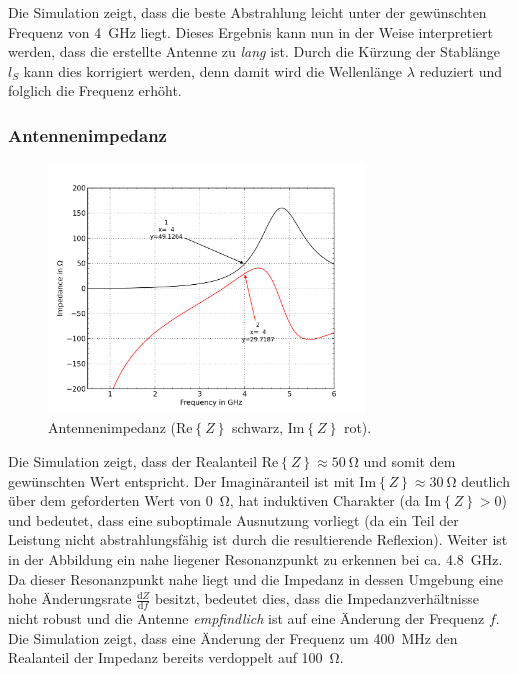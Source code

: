 Die Simulation zeigt, dass die beste Abstrahlung leicht unter der
gewünschten Frequenz von \SI{4}{\giga\hertz} liegt. Dieses Ergebnis
kann nun in der Weise interpretiert werden, dass die erstellte
Antenne zu \emph{lang} ist. Durch die Kürzung der Stablänge $l_S$
kann dies korrigiert werden, denn damit wird die Wellenlänge
$\lambda$ reduziert und folglich die Frequenz erhöht.

\newpage
\subsubsection{Antennenimpedanz}

\begin{figure}[h!]
	\centering
	\includegraphics[width=0.75\textwidth]{../fig/plt/monopol_a_sim_impedance.png}
	\caption{Antennenimpedanz ($\mathrm{Re}\left\{Z\right\}$ schwarz,  $\mathrm{Im}\left\{Z\right\}$ rot).}
\end{figure}

Die Simulation zeigt, dass der Realanteil
$\mathrm{Re}\left\{Z\right\} \approx \SI{50}{\ohm}$ und somit dem
gewünschten Wert entspricht. Der Imaginäranteil ist mit
$\mathrm{Im}\left\{Z\right\} \approx \SI{30}{\ohm}$ deutlich über
dem geforderten Wert von \SI{0}{\ohm}, hat induktiven Charakter (da
$\mathrm{Im}\left\{Z\right\} > 0$) und bedeutet, dass eine suboptimale
Ausnutzung vorliegt (da ein Teil der Leistung nicht abstrahlungsfähig
ist durch die resultierende Reflexion). Weiter ist in der Abbildung ein
nahe liegener Resonanzpunkt zu erkennen bei ca. \SI{4.8}{\giga\hertz}.
Da dieser Resonanzpunkt nahe liegt und die Impedanz in dessen Umgebung
eine hohe Änderungsrate $\frac{\mathrm{d}Z}{\mathrm{d}f}$ besitzt,
bedeutet dies, dass die Impedanzverhältnisse nicht robust und die
Antenne \emph{empfindlich} ist auf eine Änderung der Frequenz $f$.
Die Simulation zeigt, dass eine Änderung der Frequenz um 
\SI{400}{\mega\hertz} den Realanteil der Impedanz bereits
verdoppelt auf \SI{100}{\ohm}.


